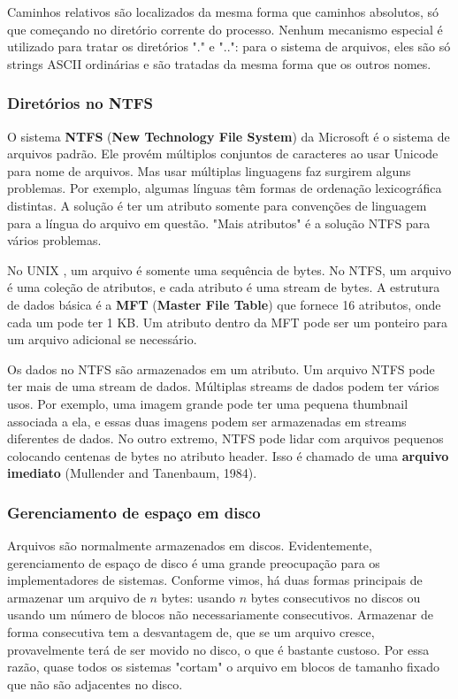 \documentclass{article}
\newcommand\unix{{\color{red}UNIX} }
\begin{document}
Caminhos relativos são localizados da mesma forma que caminhos absolutos, só que começando no diretório corrente do processo. Nenhum mecanismo especial é utilizado para tratar os diretórios "." e "..": para o sistema de arquivos, eles são só strings ASCII ordinárias e são tratadas da mesma forma que os outros nomes.

\subsubsection{Diretórios no NTFS}

O sistema \textbf{NTFS} (\textbf{New Technology File System}) da Microsoft é o sistema de arquivos padrão. Ele provém múltiplos conjuntos de caracteres ao usar Unicode para nome de arquivos. Mas usar múltiplas linguagens faz surgirem alguns problemas. Por exemplo, algumas línguas têm formas de ordenação lexicográfica distintas. A solução é ter um atributo somente para convenções de linguagem para a língua do arquivo em questão. "Mais atributos" é a solução NTFS para vários problemas. 

No \unix, um arquivo é somente uma sequência de bytes. No NTFS, um arquivo é uma coleção de atributos, e cada atributo é uma stream de bytes. A estrutura de dados básica é a \textbf{MFT} (\textbf{Master File Table}) que fornece 16 atributos, onde cada um pode ter 1 KB. Um atributo dentro da MFT pode ser um ponteiro para um arquivo adicional se necessário. 

Os dados no NTFS são armazenados em um atributo. Um arquivo NTFS pode ter mais de uma stream de dados. Múltiplas streams de dados podem ter vários usos. Por exemplo, uma imagem grande pode ter uma pequena thumbnail associada a ela, e essas duas imagens podem ser armazenadas em streams diferentes de dados. No outro extremo, NTFS pode lidar com arquivos pequenos colocando centenas de bytes no atributo header. Isso é chamado de uma \textbf{arquivo imediato} (Mullender and Tanenbaum, 1984).

\subsubsection{Gerenciamento de espaço em disco}

Arquivos são normalmente armazenados em discos. Evidentemente, gerenciamento de espaço de disco é uma grande preocupação para os implementadores de sistemas. Conforme vimos, há duas formas principais de armazenar um arquivo de $n$ bytes: usando $n$ bytes consecutivos no discos ou usando um número de blocos não necessariamente consecutivos. Armazenar de forma consecutiva tem a desvantagem de, que se um arquivo cresce, provavelmente terá de ser movido no disco, o que é bastante custoso. Por essa razão, quase todos os sistemas "cortam" o arquivo em blocos de tamanho fixado que não são adjacentes no disco.
\end{document}

